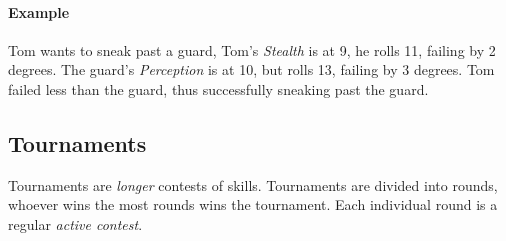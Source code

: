 \paragraph{Example} Tom wants to sneak past a guard, Tom's \textit{Stealth} is at 9, he rolls 11, failing by 2 degrees. 
The guard's \textit{Perception} is at 10, but rolls 13, failing by 3 degrees. 
Tom failed less than the guard, thus successfully sneaking past the guard.

\subsection{Tournaments}
Tournaments are \textit{longer} contests of skills.
Tournaments are divided into rounds, whoever wins the most rounds wins the tournament.
Each individual round is a regular \textit{active contest}.
